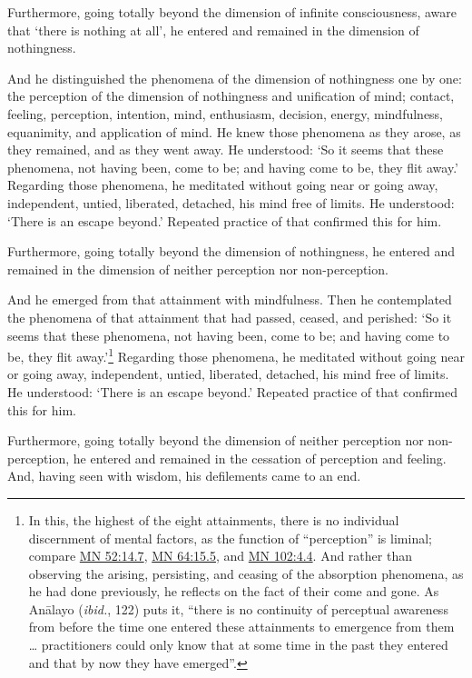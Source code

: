 \documentclass[12pt,openany]{book}%
\begin{document}
Furthermore, going totally beyond the dimension of infinite consciousness, aware that ‘there is nothing at all’, he entered and remained in the dimension of nothingness. 

And he distinguished the phenomena of the dimension of nothingness one by one: the perception of the dimension of nothingness and unification of mind; contact, feeling, perception, intention, mind, enthusiasm, decision, energy, mindfulness, equanimity, and application of mind. He knew those phenomena as they arose, as they remained, and as they went away. He understood: ‘So it seems that these phenomena, not having been, come to be; and having come to be, they flit away.’ Regarding those phenomena, he meditated without going near or going away, independent, untied, liberated, detached, his mind free of limits. He understood: ‘There is an escape beyond.’ Repeated practice of that confirmed this for him. 

Furthermore, going totally beyond the dimension of nothingness, he entered and remained in the dimension of neither perception nor non-perception. 

And he emerged from that attainment with mindfulness. Then he contemplated the phenomena of that attainment that had passed, ceased, and perished: ‘So it seems that these phenomena, not having been, come to be; and having come to be, they flit away.’\footnote{In this, the highest of the eight attainments, there is no individual discernment of mental factors, as the function of “perception” is liminal; compare \href{https://suttacentral.net/mn52/en/sujato\#14.7}{MN 52:14.7}, \href{https://suttacentral.net/mn64/en/sujato\#15.5}{MN 64:15.5}, and \href{https://suttacentral.net/mn102/en/sujato\#4.4}{MN 102:4.4}. And rather than observing the arising, persisting, and ceasing of the absorption phenomena, as he had done previously, he reflects on the fact of their come and gone. As \textsanskrit{Anālayo} (\emph{ibid.}, 122) puts it, “there is no continuity of perceptual awareness from before the time one entered these attainments to emergence from them … practitioners could only know that at some time in the past they entered and that by now they have emerged”. } Regarding those phenomena, he meditated without going near or going away, independent, untied, liberated, detached, his mind free of limits. He understood: ‘There is an escape beyond.’ Repeated practice of that confirmed this for him. 

Furthermore, going totally beyond the dimension of neither perception nor non-perception, he entered and remained in the cessation of perception and feeling. And, having seen with wisdom, his defilements came to an end. 
\end{document}
